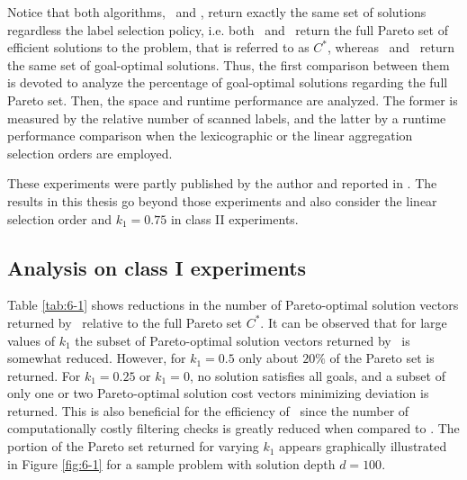 Notice that both algorithms, \namoa \ and \lexgo, return exactly the same set of solutions regardless the label selection policy, i.e. both \namoalex \ and \namoalin \ return the full Pareto set of efficient solutions to the problem, that is referred to as $C^*$, whereas \lexgolex \ and \lexgolin \ return the same set of goal-optimal solutions. Thus, the first comparison between them is devoted to analyze the percentage of goal-optimal solutions regarding the full Pareto set. Then, the space and runtime performance are analyzed. The former is measured by the relative number of scanned labels, and the latter by a runtime performance comparison when the lexicographic or the linear aggregation selection orders are employed. 

These experiments were partly published by the author and reported in \citep{Pulido2014}. The results in this thesis go beyond those experiments and also consider the linear selection order and $k_1 = 0.75$ in class II experiments. 

\subsection{Analysis on class I experiments}
\label{chapEmpiricalAnalysis:subsec:analysisgridslexgoc1}

Table \ref{tab:6-1} shows reductions in the number of Pareto-optimal solution vectors returned by \lexgo \ relative to the full Pareto set $C^*$. 
It can be observed that for large values of $k_1$ the subset of Pareto-optimal solution vectors returned by \lexgo \ is somewhat reduced. However, for $k_1=0.5$ only about $20\%$ of the Pareto set is returned. For $k_1=0.25$ or $k_1=0$, no solution satisfies all goals, and a subset of only one or two Pareto-optimal solution cost vectors minimizing deviation is returned. This is also beneficial for the efficiency of \lexgo \ since the number of computationally costly filtering checks is greatly reduced when compared to \namoa. The portion of the Pareto set returned for varying $k_1$ appears graphically illustrated in Figure \ref{fig:6-1} for a sample problem with solution depth $d=100$.

